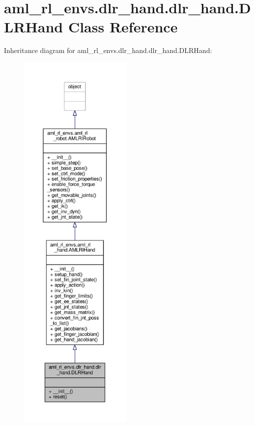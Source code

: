 \hypertarget{classaml__rl__envs_1_1dlr__hand_1_1dlr__hand_1_1_d_l_r_hand}{\section{aml\-\_\-rl\-\_\-envs.\-dlr\-\_\-hand.\-dlr\-\_\-hand.\-D\-L\-R\-Hand Class Reference}
\label{classaml__rl__envs_1_1dlr__hand_1_1dlr__hand_1_1_d_l_r_hand}
}


Inheritance diagram for aml\-\_\-rl\-\_\-envs.\-dlr\-\_\-hand.\-dlr\-\_\-hand.\-D\-L\-R\-Hand\-:
\nopagebreak
\begin{figure}[H]
\begin{center}
\leavevmode
\includegraphics[height=550pt]{classaml__rl__envs_1_1dlr__hand_1_1dlr__hand_1_1_d_l_r_hand__inherit__graph}
\end{center}
\end{figure}


